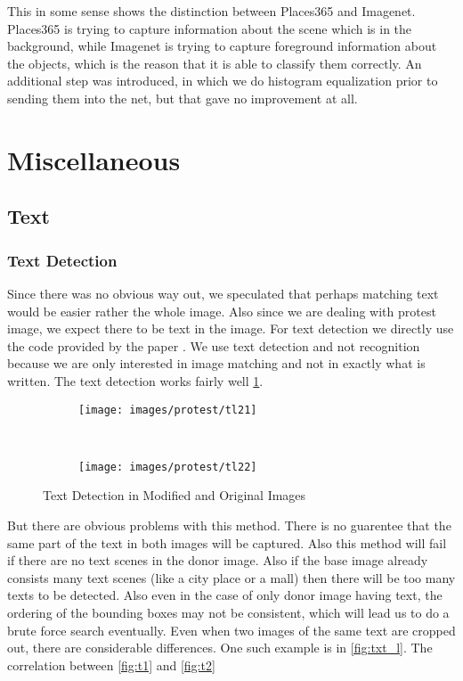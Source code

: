 \documentclass{article}
\begin{document}
This in some sense shows the distinction between Places365 and Imagenet. Places365 is trying to capture information about the scene which is in the background, while Imagenet is trying to capture foreground information about the objects, which is the reason that it is able to classify them correctly. An additional step was introduced, in which we do histogram equalization prior to sending them into the net, but that gave no improvement at all.
\section{Miscellaneous}
\subsection{Text}
\subsubsection{Text Detection}
Since there was no obvious way out, we speculated that perhaps matching text would be easier rather the whole image. Also since we are dealing with protest image, we expect there to be text in the image. For text detection we directly use the code provided by the paper \cite{DBLP:journals/corr/TianHHH016}. We use text detection and not recognition because we are only interested in image matching and not in exactly what is written. The text detection works fairly well \ref{fig:pr_imgs}.

\begin{figure}[H]
  \centering
  \begin{subfigure}[H]{0.4\linewidth}
    \texttt{[image: images/protest/tl21]}
  \end{subfigure}
  ~
  \begin{subfigure}[H]{0.4\linewidth}
    \texttt{[image: images/protest/tl22]}
  \end{subfigure}
  \caption{Text Detection in Modified and Original Images}
  \label{fig:pr_imgs}
\end{figure}

But there are obvious problems with this method. There is no guarentee that the same part of the text in both images will be captured. Also this method will fail if there are no text scenes in the donor image. Also if the base image already consists many text scenes (like a city place or a mall) then there will be too many texts to be detected. Also even in the case of only donor image having text, the ordering of the bounding boxes may not be consistent, which will lead us to do a brute force search eventually. Even when two images of the same text are cropped out, there are considerable differences. One such example is in \ref{fig:txt_l}. The correlation between \ref{fig:t1} and \ref{fig:t2}
\end{document}
